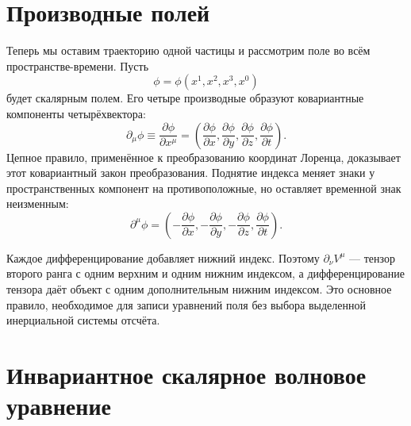 \begin{classroomqa}
\end{classroomqa}

\section{Производные полей}

Теперь мы оставим траекторию одной частицы и рассмотрим поле во всём пространстве-времени. Пусть
\begin{equation}
  \phi=\phi(x^1,x^2,x^3,x^0)
\end{equation}
будет скалярным полем. Его четыре производные образуют ковариантные компоненты четырёхвектора:
\begin{equation}
  \partial_\mu\phi
  \equiv\frac{\partial\phi}{\partial x^\mu}
  =\left(
    \frac{\partial\phi}{\partial x},
    \frac{\partial\phi}{\partial y},
    \frac{\partial\phi}{\partial z},
    \frac{\partial\phi}{\partial t}
  \right).
\end{equation}
Цепное правило, применённое к преобразованию координат Лоренца, доказывает этот ковариантный закон преобразования. Поднятие индекса меняет знаки у пространственных компонент на противоположные, но оставляет временной знак неизменным:
\begin{equation}
  \partial^\mu\phi
  =\left(
    -\frac{\partial\phi}{\partial x},
    -\frac{\partial\phi}{\partial y},
    -\frac{\partial\phi}{\partial z},
    \frac{\partial\phi}{\partial t}
  \right).
\end{equation}

Каждое дифференцирование добавляет нижний индекс. Поэтому
\(\partial_\nu V^\mu\) — тензор второго ранга с одним верхним и одним нижним индексом, а дифференцирование тензора даёт объект с одним дополнительным нижним индексом. Это основное правило, необходимое для записи уравнений поля без выбора выделенной инерциальной системы отсчёта.

\section{Инвариантное скалярное волновое уравнение}

